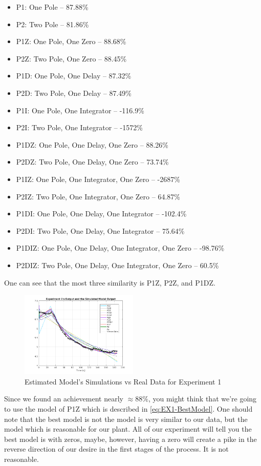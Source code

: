 \documentclass[11pt,a4paper,twocolumn]{article}
\begin{document}
\begin{itemize}
    \item P1: One Pole -- 87.88\%
    \item P2: Two Pole -- 81.86\%
    \item P1Z: One Pole, One Zero -- 88.68\%
    \item P2Z: Two Pole, One Zero -- 88.45\%
    \item P1D: One Pole, One Delay -- 87.32\%
    \item P2D: Two Pole, One Delay -- 87.49\%
    \item P1I: One Pole, One Integrator -- -116.9\%
    \item P2I: Two Pole, One Integrator -- -1572\%
    \item P1DZ: One Pole, One Delay, One Zero -- 88.26\%
    \item P2DZ: Two Pole, One Delay, One Zero -- 73.74\%
    \item P1IZ: One Pole, One Integrator, One Zero -- -2687\%
    \item P2IZ: Two Pole, One Integrator, One Zero -- 64.87\%
    \item P1DI: One Pole, One Delay, One Integrator -- -102.4\%
    \item P2DI: Two Pole, One Delay, One Integrator -- 75.64\%
    \item P1DIZ: One Pole, One Delay, One Integrator, One Zero -- -98.76\%
    \item P2DIZ: Two Pole, One Delay, One Integrator, One Zero -- 60.5\%
\end{itemize}

One can see that the most three similarity is P1Z, P2Z, and P1DZ.

\begin{figure}[H]
    \centering
    \includegraphics[width=0.5\textwidth]{Graphs/Exp1Output-SimulatedModel.png}
    \caption{Estimated Model's Simulations vs Real Data for Experiment 1}
\end{figure}

Since we found an achievement nearly $\approx 88\%$, you might think that we're going to use the model of P1Z which is described in \eqref{eq:EX1-BestModel}. One should note that the best model is not the model is very similar to our data, but the model which is reasonable for our plant. All of our experiment will tell you the best model is with zeros, maybe, however, having a zero will create a pike in the reverse direction of our desire in the first stages of the process. It is not reasonable.
\end{document}
